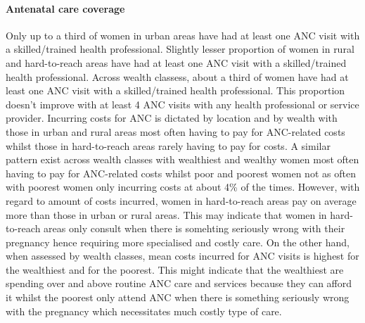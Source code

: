 \documentclass[12pt,a4paper]{article}
\let\oldparagraph\paragraph
\renewcommand{\paragraph}[1]{\oldparagraph{#1}\mbox{}}
\begin{document}
\hypertarget{ancCoverage}{%
\paragraph{Antenatal care coverage}\label{ancCoverage}}

Only up to a third of women in urban areas have had at least one ANC visit with a skilled/trained health professional. Slightly lesser proportion of women in rural and hard-to-reach areas have had at least one ANC visit with a skilled/trained health professional. Across wealth classess, about a third of women have had at least one ANC visit with a skilled/trained health professional. This proportion doesn't improve with at least 4 ANC visits with any health professional or service provider. Incurring costs for ANC is dictated by location and by wealth with those in urban and rural areas most often having to pay for ANC-related costs whilst those in hard-to-reach areas rarely having to pay for costs. A similar pattern exist across wealth classes with wealthiest and wealthy women most often having to pay for ANC-related costs whilst poor and poorest women not as often with poorest women only incurring costs at about 4\% of the times. However, with regard to amount of costs incurred, women in hard-to-reach areas pay on average more than those in urban or rural areas. This may indicate that women in hard-to-reach areas only consult when there is somehting seriously wrong with their pregnancy hence requiring more specialised and costly care. On the other hand, when assessed by wealth classes, mean costs incurred for ANC visits is highest for the wealthiest and for the poorest. This might indicate that the wealthiest are spending over and above routine ANC care and services because they can afford it whilst the poorest only attend ANC when there is something seriously wrong with the pregnancy which necessitates much costly type of care.
\end{document}
